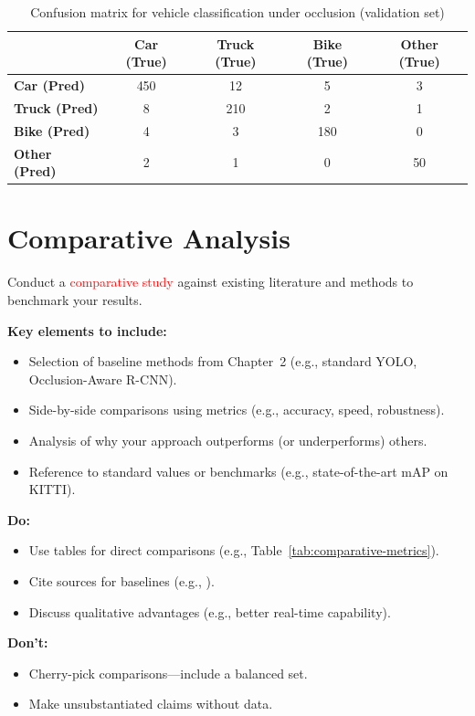 \documentclass[12pt,a4paper]{report}
\theoremstyle{definition}
\theoremstyle{remark}
\begin{document}
\begin{table}[h]
    \centering
    \caption{Confusion matrix for vehicle classification under occlusion (validation set)}
    \label{tab:confusion-matrix}
    \begin{tabular}{|l|c|c|c|c|}
    \hline
    & \textbf{Car (True)} & \textbf{Truck (True)} & \textbf{Bike (True)} & \textbf{Other (True)} \\
    \hline
    \textbf{Car (Pred)} & 450 & 12 & 5 & 3 \\
    \textbf{Truck (Pred)} & 8 & 210 & 2 & 1 \\
    \textbf{Bike (Pred)} & 4 & 3 & 180 & 0 \\
    \textbf{Other (Pred)} & 2 & 1 & 0 & 50 \\
    \hline
    \end{tabular}
\end{table}

\section{Comparative Analysis}
\label{sec:comparative-analysis}

Conduct a \textcolor{red}{comparative study} against existing literature and methods to benchmark your results.

\noindent \textbf{Key elements to include:}
\begin{itemize}
    \item Selection of baseline methods from Chapter~2 (e.g., standard YOLO, Occlusion-Aware R-CNN).
    \item Side-by-side comparisons using metrics (e.g., accuracy, speed, robustness).
    \item Analysis of why your approach outperforms (or underperforms) others.
    \item Reference to standard values or benchmarks (e.g., state-of-the-art mAP on KITTI).
\end{itemize}

\noindent \textbf{Do:}
\begin{itemize}
    \item Use tables for direct comparisons (e.g., Table~\ref{tab:comparative-metrics}).
    \item Cite sources for baselines (e.g., \cite{article1,book1}).
    \item Discuss qualitative advantages (e.g., better real-time capability).
\end{itemize}

\noindent \textbf{Don’t:}
\begin{itemize}
    \item Cherry-pick comparisons—include a balanced set.
    \item Make unsubstantiated claims without data.
\end{itemize}
\end{document}
